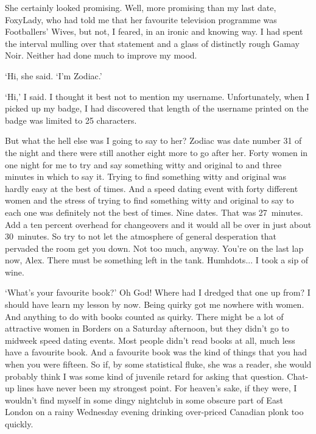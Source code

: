 
\twelverm
She certainly {\twelveit looked\/} promising. Well, more promising
than my last date, FoxyLady, who had told me that her favourite
television programme was {\twelvesl Footballers' Wives\/}, but not,
I feared, in an ironic and knowing way. I had spent the interval
mulling over that statement and a glass of distinctly rough
Gamay Noir. Neither had done much to improve my mood.

`Hi, she said. `I'm Zodiac.'

`Hi,' I said. I thought it best not to mention my username.
Unfortunately, when I picked up my badge, I had discovered that
length of the username printed on the badge was limited to 25
characters.

But what the hell else was I going to say to her? Zodiac was date
number 31 of the night and there were still another eight more to
go after her. Forty women in one night for me to try and say
something witty and original to and three minutes in which to say
it. Trying to find something witty and original was hardly easy at
the best of times. And a speed dating event with forty different
women and the stress of trying to find something witty and original
to say to each one was definitely not the best of times. Nine
dates. That was 27~minutes. Add a ten percent overhead for
changeovers and it would all be over in just about 30~minutes. So
try to not let the atmosphere of general desperation that pervaded
the room get you down. Not too much, anyway. You're on the last lap
now, Alex. There must be something left in the tank. Humh{dots...} I took a
sip of wine.

`What's your favourite book?' Oh God! Where had I dredged that one
up from? I should have learn my lesson by now. Being quirky got me
nowhere with women. And anything to do with books counted as quirky.
There might be a lot of attractive women in Borders on a Saturday
afternoon, but they didn't go to midweek speed dating events. Most
people didn't read books at all, much less have a favourite book.
And a favourite book was the kind of things that you had when you
were fifteen. So if, by some statistical fluke, she was a reader,
she would probably think I was some kind of juvenile retard for
asking that question. Chat-up lines have never been my strongest
point. For heaven's sake, if they were, I wouldn't find myself in
some dingy nightclub in some obscure part of East London on a rainy
Wednesday evening drinking over-priced Canadian plonk too quickly.

